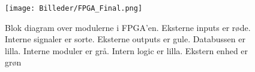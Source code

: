 \begin{figure}[ht]
	\begin{center}
		\texttt{[image: Billeder/FPGA\_Final.png]}
	\end{center}
\caption{Blok diagram over modulerne i FPGA'en. Eksterne inputs er røde. Interne signaler er sorte. Eksterne outputs er gule. Databussen er lilla. Interne moduler er grå. Intern logic er lilla. Ekstern enhed er grøn}
\label{fig:FPGA_Final}
\end{figure}